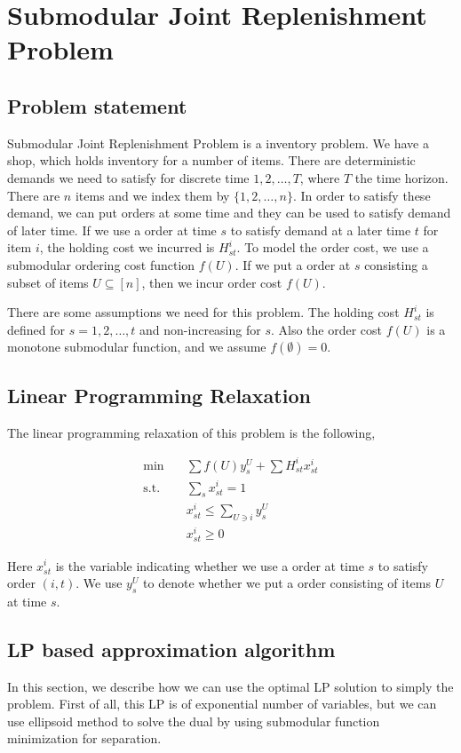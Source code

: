 \section{Submodular Joint Replenishment Problem}
\subsection{Problem statement}
Submodular Joint Replenishment Problem is a inventory problem. We have a shop, which holds inventory for a number of items. There are deterministic demands we need to satisfy for discrete time $1,2,\ldots, T$, where $T$ the time horizon. There are $n$ items and we index them by $\{1,2,\ldots, n\}$. In order to satisfy these demand, we can put orders at some time and they can be used to satisfy demand of later time. If we use a order at time $s$ to satisfy demand at a later time $t$ for item $i$, the holding cost we incurred is $H^i_{st}$. To model the order cost, we use a submodular ordering cost function $f(U)$. If we put a order at $s$ consisting a subset of items $U \subseteq [n]$, then we incur order cost $f(U)$.

There are some assumptions we need for this problem. The holding cost $H^i_{st}$ is defined for $s = 1,2,\ldots, t$ and non-increasing for $s$. Also the order cost $f(U)$ is a monotone submodular function, and we assume $f(\emptyset) = 0$.

\subsection{Linear Programming Relaxation}
The linear programming relaxation of this problem is the following,

\begin{align*}
\min		\quad 	& \sum f(U) y^U_s + \sum H^i_{st}x^i_{st} \\
\text{s.t.}	\quad	& \sum_s x^i_{st} = 1 \\
				& x^i_{st} \le \sum_{U \ni i} y^U_s \\
				& x^i_{st} \ge 0
\end{align*}

Here $x^i_{st}$ is the variable indicating whether we use a order at time $s$ to satisfy order $(i,t)$. We use $y^U_s$ to denote whether we put a order consisting of items $U$ at time $s$.

\subsection{LP based approximation algorithm}
In this section, we describe how we can use the optimal LP solution to simply the problem. First of all, this LP is of exponential number of variables, but we can use ellipsoid method to solve the dual by using submodular function minimization for separation.

